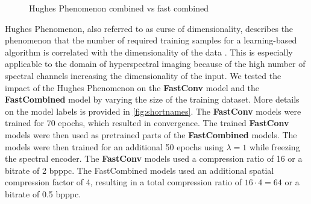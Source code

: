 \begin{figure}[!ht]
    \centering
{}\datatable
{}
\caption{Hughes Phenomenon combined vs fast combined}
\label{fig:hughesangle}
\end{figure}

Hughes Phenomenon, also referred to as curse of dimensionality, describes the phenomenon that the number of required training samples for a learning-based algorithm is correlated with the dimensionality of the data \citep{hughes_mean_1968}. This is especially applicable to the domain of hyperspectral imaging because of the high number of spectral channels increasing the dimensionality of the input. We tested the impact of the Hughes Phenomenon on the \textbf{FastConv} model and the \textbf{FastCombined} model by varying the size of the training dataset. More details on the model labels is provided in \autoref{fig:shortnames}. The \textbf{FastConv} models were trained for 70 epochs, which resulted in convergence.
The trained \textbf{FastConv} models were then used as pretrained parts of the \textbf{FastCombined} models. The models were then trained for an additional 50 epochs using $\lambda=1$ while freezing the spectral encoder. 
The \textbf{FastConv} models used a compression ratio of 16 or a bitrate of 2 \ac{bpppc}. The FastCombined models used an additional spatial compression factor of 4, resulting in a total compression ratio of $16 \cdot 4=64$ or a bitrate of 0.5 \ac{bpppc}.

